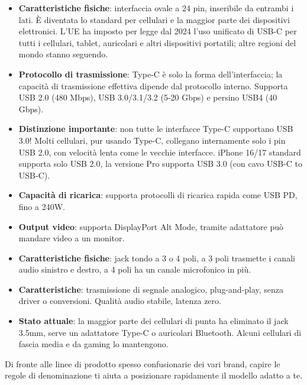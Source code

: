 
\begin{itemize}
  \item \textbf{Caratteristiche fisiche}: interfaccia ovale a 24 pin, inseribile da entrambi i lati. È diventata lo standard per cellulari e la maggior parte dei dispositivi elettronici. L'UE ha imposto per legge dal 2024 l'uso unificato di USB-C per tutti i cellulari, tablet, auricolari e altri dispositivi portatili; altre regioni del mondo stanno seguendo.
  \item \textbf{Protocollo di trasmissione}: Type-C è solo la forma dell'interfaccia; la capacità di trasmissione effettiva dipende dal protocollo interno. Supporta USB 2.0 (480 Mbps), USB 3.0/3.1/3.2 (5-20 Gbps) e persino USB4 (40 Gbps).
  \item \textbf{Distinzione importante}: non tutte le interfacce Type-C supportano USB 3.0! Molti cellulari, pur usando Type-C, collegano internamente solo i pin USB 2.0, con velocità lenta come le vecchie interfacce. iPhone 16/17 standard supporta solo USB 2.0, la versione Pro supporta USB 3.0 (con cavo USB-C to USB-C).
  \item \textbf{Capacità di ricarica}: supporta protocolli di ricarica rapida come USB PD, fino a 240W.
  \item \textbf{Output video}: supporta DisplayPort Alt Mode, tramite adattatore può mandare video a un monitor.
\end{itemize}


\begin{itemize}
  \item \textbf{Caratteristiche fisiche}: jack tondo a 3 o 4 poli, a 3 poli trasmette i canali audio sinistro e destro, a 4 poli ha un canale microfonico in più.
  \item \textbf{Caratteristiche}: trasmissione di segnale analogico, plug-and-play, senza driver o conversioni. Qualità audio stabile, latenza zero.
  \item \textbf{Stato attuale}: la maggior parte dei cellulari di punta ha eliminato il jack 3.5mm, serve un adattatore Type-C o auricolari Bluetooth. Alcuni cellulari di fascia media e da gaming lo mantengono.
\end{itemize}


Di fronte alle linee di prodotto spesso confusionarie dei vari brand, capire le regole di denominazione ti aiuta a posizionare rapidamente il modello adatto a te.

